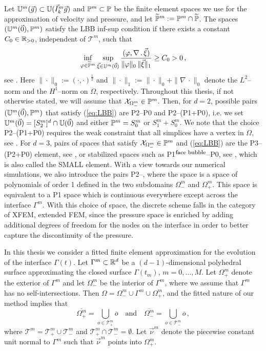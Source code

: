 Let $\uspacedisc{g}{m}\subset\uspacesimple(\vec I_k^m\vec g)$ and
$\pspace^m\subset\pspace$ be the finite element spaces we use for the
approximation of velocity and pressure, and let $\pnormspace^m:= \pspace^m \cap
\pnormspace$. The spaces $(\uspacedisc{0}{m},\pspace^m)$ satisfy the LBB
inf-sup condition if there exists a constant $C_0 \in \R_{>0}$, independent of
$\mathcal{T}^m$, such that
\begin{equation} \label{eq:LBB}
\inf_{\varphi \in \pnormspace^m} \sup_{\vec \xi \in \uspacedisc{0}{m}}
\frac{( \varphi, \nabla \,.\,\vec \xi)} {\|\varphi\|_0\,\|\vec \xi\|_1}
\geq C_0 > 0\,,
\end{equation}
see \cite[p.~114]{GiraultR86}. Here $\|\cdot\|_0 := (\cdot,\cdot)^\frac12$ and
$\|\cdot\|_1 := \|\cdot\|_0 + \|\nabla\,\cdot\|_0$ denote the $L^2$--norm and
the $H^1$--norm on $\Omega$, respectively. Throughout this thesis, if not
otherwise stated, we will assume that $\charfcn{\Omega^m_-}\in\pspace^m$. Then,
for $d=2$, possible pairs $(\uspacedisc{0}{m},\pspace^m)$ that satisfy
(\ref{eq:LBB}) are P2--P0 and P2--(P1+P0), i.e. we set
$\uspacedisc{0}{m}=[S^m_2]^d\cap\uspace{0}$ and either $\pspace^m = S^m_0$ or
$S^m_1+S^m_0$. We note that the choice P2--(P1+P0) requires the weak constraint
that all simplices have a vertex in $\Omega$, see \cite{BoffiCGG12}. For $d=3$,
pairs of spaces that satisfy $\charfcn{\Omega^m_-}\in\pspace^m$ and
(\ref{eq:LBB}) are the P3--(P2+P0) element, see \cite{BoffiCGG12}, or stabilized
spaces such as P1$^{\mbox{\footnotesize face bubble}}$--P0, see
\cite[Remark~8.7.1]{BoffiBF13}, which is also called the SMALL element. With a
view towards our numerical simulations, we also introduce the pairs P2--\pdg,
where the space \pdg is a space of polynomials of order 1 defined in the two
subdomains $\Omega_-^m$ and $\Omega_+^m$. This space is equivalent to a P1 space
which is continuous everywhere except across the interface $\Gamma^m$. With this
choice of space, the discrete scheme falls in the category of XFEM, extended
FEM, since the pressure space is enriched by adding additional degrees of
freedom for the nodes on the interface in order to better capture the
discontinuity of the pressure.

In this thesis we consider a fitted finite element approximation for the
evolution of the interface $\Gamma(t)$. Let $\Gamma^m\subset\R^d$ be a
$(d-1)$-dimensional polyhedral surface approximating the closed surface
$\Gamma(t_m)$, $m=0 ,\ldots, M$. Let $\Omega^m_+$ denote the exterior of
$\Gamma^m$ and let $\Omega^m_-$ be the interior of $\Gamma^m$, where we assume
that $\Gamma^m$ has no self-intersections. Then
$\Omega = \Omega_-^m \cup \Gamma^m \cup \Omega_+^m$, and the fitted nature of
our method implies that
\begin{equation} \label{eq:fittedO}
\overline{\Omega^m_+} = \bigcup_{o \in \mathcal{T}^m_+} \overline{o}
\quad\text{and}\quad
\overline{\Omega^m_-} = \bigcup_{o \in \mathcal{T}^m_-} \overline{o} \,,
\end{equation}
where $\mathcal{T}^m = \mathcal{T}^m_+ \cup \mathcal{T}^m_-$ and
$\mathcal{T}^m_+ \cap \mathcal{T}^m_- = \emptyset$.
Let $\vec \nu^m$ denote the piecewise constant unit normal to $\Gamma^m$
such that $\vec\nu^m$ points into $\Omega^m_+$.

